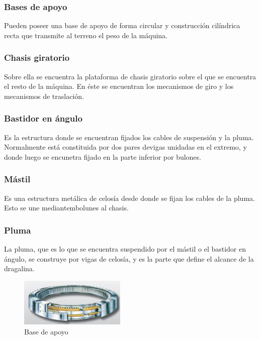 \documentclass[a4paper]{article}
\begin{document}
\subsubsection{Bases de apoyo}

Pueden poseer una base de apoyo de forma circular y construcción cilíndrica recta
que transmite al terreno el peso de la máquina.

\subsubsection{Chasis giratorio}

Sobre ella se encuentra la plataforma de chasis giratorio sobre el que se encuentra
el resto de la máquina. En éste se encuentran los mecanismos de giro y los 
mecanismos de traslación.

\subsubsection{Bastidor en ángulo}

Es la estructura donde se encuentran fijados los cables de suspensión y la pluma.
Normalmente está constituida por dos pares devigas unidadas en el extremo, y donde
luego se encunetra fijado en la parte inferior por bulones.

\subsubsection{Mástil}

Es una estructura metálica de celosía desde donde se fijan los cables de la pluma.
Esto se une mediantembolunes al chasis.

\subsubsection{Pluma}

La pluma, que es lo que se encuentra suspendido por el mástil o el bastidor en
ángulo, se construye por vigas de celosía, y es la parte que define el alcance 
de la dragalina. 

\begin{figure}[ht]
  \centering
  \includegraphics[width=0.45\textwidth]{../images/apuntes-presentacion-20210429/A3}
  \caption{Base de apoyo}
  \label{fig:A3}
\end{figure}
\end{document}
